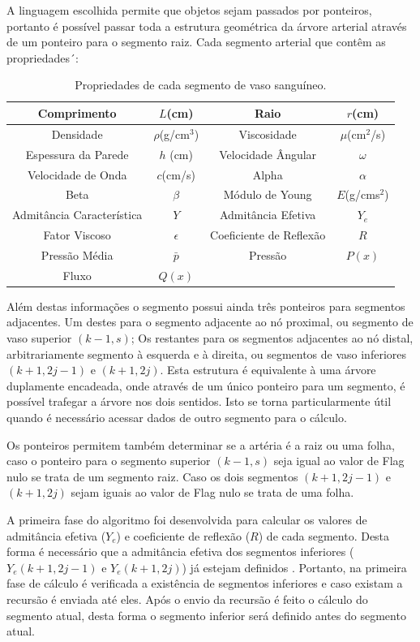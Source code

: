 \documentclass[
        english,			
        brazil			        %
        ,<...>]{abntbibufjf}
\begin{document}
A linguagem escolhida permite que objetos sejam passados por ponteiros, portanto é possível passar toda a estrutura geométrica da árvore arterial através de um ponteiro para o segmento raiz. Cada segmento arterial que contêm as propriedades´:
\begin{table}[h]
\begin{tabular}{|c|c|c|c|}
	\hline
	Comprimento & $L$(cm) & Raio & $r$(cm) \\
	\hline
	Densidade & $\rho$(g/cm$^3$) & Viscosidade & $\mu$(cm$^2$/s) \\
	\hline
	Espessura da Parede & $h$ (cm) & Velocidade Ângular & $\omega$  \\
	\hline
	Velocidade de Onda & $c$(cm/s) & Alpha & $\alpha$ \\
	\hline
	Beta & $\beta$ & Módulo de Young & $E$(g/cms$^2$)\\
	\hline
	Admitância Característica & $Y$ & Admitância Efetiva & $Y_e$\\
	\hline
	Fator Viscoso & $\epsilon$ & Coeficiente de Reflexão & $R$ \\
	\hline
	Pressão Média & $\bar{p}$ & Pressão & $P(x)$\\
	\hline
	Fluxo & $Q(x)$ && \\
	\hline
\end{tabular}
\caption{Propriedades de cada segmento de vaso sanguíneo.}
\end{table}

Além destas informações o segmento possui ainda três ponteiros para segmentos adjacentes. Um destes para o segmento adjacente ao nó proximal, ou segmento de vaso superior $(k-1,s)$; Os restantes para os segmentos adjacentes ao nó distal, arbitrariamente segmento à esquerda e à direita, ou segmentos de vaso inferiores $(k+1,2j-1)$ e $(k+1,2j)$. Esta estrutura é equivalente à uma árvore duplamente encadeada, onde através de um único ponteiro para um segmento, é possível trafegar a árvore nos dois sentidos. Isto se torna particularmente útil quando é necessário acessar dados de outro segmento para o cálculo.

Os ponteiros permitem também determinar se a artéria é a raiz ou uma folha, caso o ponteiro para o segmento superior $(k-1,s)$ seja igual ao valor de Flag nulo se trata de um segmento raiz. Caso os dois segmentos $(k+1,2j-1)$ e $(k+1,2j)$ sejam iguais ao valor de Flag nulo se trata de uma folha.

A primeira fase do algoritmo foi desenvolvida para calcular os valores de admitância efetiva ($Y_e$) e coeficiente de reflexão ($R$) de cada segmento. Desta forma é necessário que a admitância efetiva dos segmentos inferiores ($Y_e(k+1,2j-1)$ e $Y_e(k+1,2j)$) já estejam definidos . Portanto, na primeira fase de cálculo é verificada a existência de segmentos inferiores e caso existam a recursão é enviada  até eles. Após o envio da recursão é feito o cálculo do segmento atual, desta forma o segmento inferior será definido antes do segmento atual.
\end{document}
